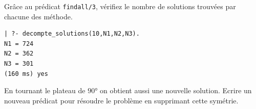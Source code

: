 \documentclass[a4paper]{article}
\newenvironment{CAnswer}{\color{red}\begin{Answer}}
                        {\end{Answer}}
\begin{document}
\begin{Exercise}[title={Vérification}]
Grâce au prédicat \verb$findall/3$, vérifiez le nombre de solutions trouvées
par chacune des méthode.
\end{Exercise}
\begin{CAnswer}

\begin{verbatim}
| ?- decompte_solutions(10,N1,N2,N3).
N1 = 724
N2 = 362
N3 = 301
(160 ms) yes
\end{verbatim}
\end{CAnswer}

\begin{Exercise}[title={Et pour aller plus loin}]
En tournant le plateau de $90°$ on obtient aussi une nouvelle solution. Ecrire
un nouveau prédicat pour résoudre le problème en supprimant cette symétrie.
\end{Exercise}
\begin{CAnswer}

\end{CAnswer}
\end{document}
